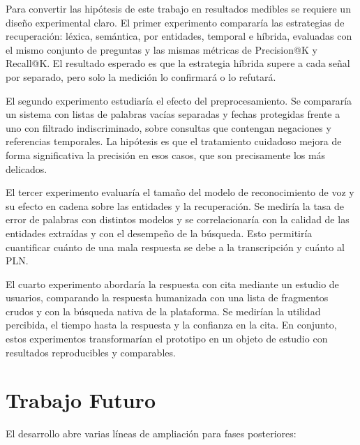 \documentclass[12pt,a4paper]{article}
\begin{document}
Para convertir las hipótesis de este trabajo en resultados medibles se requiere un diseño experimental claro. El primer experimento compararía las estrategias de recuperación: léxica, semántica, por entidades, temporal e híbrida, evaluadas con el mismo conjunto de preguntas y las mismas métricas de Precision@K y Recall@K. El resultado esperado es que la estrategia híbrida supere a cada señal por separado, pero solo la medición lo confirmará o lo refutará.

El segundo experimento estudiaría el efecto del preprocesamiento. Se compararía un sistema con listas de palabras vacías separadas y fechas protegidas frente a uno con filtrado indiscriminado, sobre consultas que contengan negaciones y referencias temporales. La hipótesis es que el tratamiento cuidadoso mejora de forma significativa la precisión en esos casos, que son precisamente los más delicados.

El tercer experimento evaluaría el tamaño del modelo de reconocimiento de voz y su efecto en cadena sobre las entidades y la recuperación. Se mediría la tasa de error de palabras con distintos modelos y se correlacionaría con la calidad de las entidades extraídas y con el desempeño de la búsqueda. Esto permitiría cuantificar cuánto de una mala respuesta se debe a la transcripción y cuánto al PLN.

El cuarto experimento abordaría la respuesta con cita mediante un estudio de usuarios, comparando la respuesta humanizada con una lista de fragmentos crudos y con la búsqueda nativa de la plataforma. Se medirían la utilidad percibida, el tiempo hasta la respuesta y la confianza en la cita. En conjunto, estos experimentos transformarían el prototipo en un objeto de estudio con resultados reproducibles y comparables.


\section{Trabajo Futuro}
\label{sec:futuro}

El desarrollo abre varias líneas de ampliación para fases posteriores:
\end{document}
